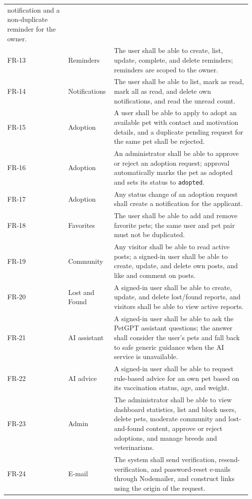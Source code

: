 \begin{center}
\begin{longtable}{@{}p{1.1cm}p{3.4cm}p{10.0cm}@{}}
notification and a non-duplicate reminder for the owner. \\
FR-13 & Reminders & The user shall be able to create, list, update, complete,
and delete reminders; reminders are scoped to the owner. \\
FR-14 & Notifications & The user shall be able to list, mark as read, mark all
as read, and delete own notifications, and read the unread count. \\
FR-15 & Adoption & A user shall be able to apply to adopt an available pet with
contact and motivation details, and a duplicate pending request for the same pet
shall be rejected. \\
FR-16 & Adoption & An administrator shall be able to approve or reject an
adoption request; approval automatically marks the pet as adopted and sets its
status to \texttt{adopted}. \\
FR-17 & Adoption & Any status change of an adoption request shall create a
notification for the applicant. \\
FR-18 & Favorites & The user shall be able to add and remove favorite pets; the
same user and pet pair must not be duplicated. \\
FR-19 & Community & Any visitor shall be able to read active posts; a signed-in
user shall be able to create, update, and delete own posts, and like and comment
on posts. \\
FR-20 & Lost and Found & A signed-in user shall be able to create, update, and
delete lost/found reports, and visitors shall be able to view active reports. \\
FR-21 & AI assistant & A signed-in user shall be able to ask the PetGPT
assistant questions; the answer shall consider the user's pets and fall back to
safe generic guidance when the AI service is unavailable. \\
FR-22 & AI advice & A signed-in user shall be able to request rule-based advice
for an own pet based on its vaccination status, age, and weight. \\
FR-23 & Admin & The administrator shall be able to view dashboard statistics,
list and block users, delete pets, moderate community and lost-and-found content,
approve or reject adoptions, and manage breeds and veterinarians. \\
FR-24 & E-mail & The system shall send verification, resend-verification, and
password-reset e-mails through Nodemailer, and construct links using the origin
of the request. \\
\bottomrule
\end{longtable}
\end{center}

